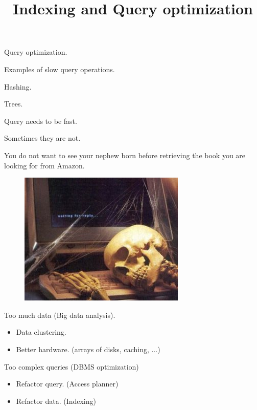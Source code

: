 \documentclass{beamer}
\title{Indexing and Query optimization}
\author{ }
\institute{Hogeschool Rotterdam \\ 
Rotterdam, Netherlands}
\date{}
\begin{document}
\maketitle

\begin{slide}{
\item Query optimization.
\item Examples of slow query operations.
\item Hashing.
\item Trees.
}\end{slide}

\begin{slide}{
\item Query needs to be fast.
\item Sometimes they are not.
\item You do not want to see your nephew born before retrieving the book you are looking for from Amazon.

\begin{figure}
\centering
\includegraphics[scale=0.35]{img/skeleton_computer}
\end{figure}
}\end{slide}

\begin{slide}{
\item Too much data (Big data analysis).
	\begin{itemize}
	\item Data clustering.
	\item Better hardware. (arrays of disks, caching, ...)
	\end{itemize}
\item Too complex queries (DBMS optimization)
	\begin{itemize}
	\item Refactor query. (Access planner)
	\item Refactor data. (Indexing)
	\end{itemize}
}\end{slide}
\end{document}
